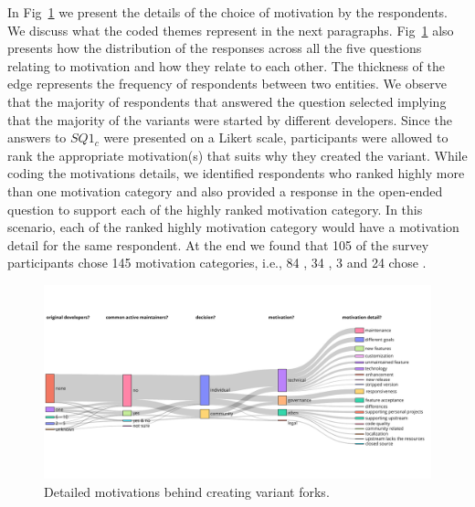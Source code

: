 In Fig~\ref{fig:sankey_motivation} we present the details of the choice of motivation by the respondents. We discuss what the coded themes represent in the next paragraphs.
Fig~\ref{fig:sankey_motivation} also presents how the distribution of the responses across all the five questions relating to motivation and how they relate to each other. The thickness of the edge represents the frequency of respondents between two entities.
We observe that
the majority of respondents that answered the question  selected  implying that the majority of the variants were started by different developers.
Since the answers to $SQ1_{c}$ were presented on a Likert scale, participants were allowed to rank the appropriate motivation(s) that suits why they created the variant. While coding the motivations details, we identified respondents who ranked highly more than one motivation category and also provided a response in the open-ended question to support each of the highly ranked motivation category. In this scenario, each of the ranked highly motivation category would have a motivation detail for the same respondent. %
At the end we found that 105 of the survey participants chose 145 motivation categories, i.e., 84 , 34 , 3  and 24 chose . 

\begin{figure}[ht]
\begin{center}
    \centering
    \includegraphics[width=\textwidth]{pdfs/sankey_motivations_2.pdf}
    \caption{Detailed motivations behind creating variant forks.
    }
    \label{fig:sankey_motivation}
\end{center}
\vspace{-.3cm}
\end{figure}

